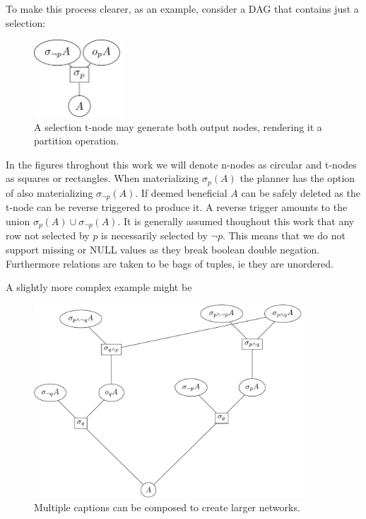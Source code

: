 To make this process clearer, as an example, consider a DAG that
contains just a selection:

\begin{figure}[H]
  \centering
  \includegraphics[width=0.3\textwidth]{./imgs/selnet.pdf}
  \caption{A selection t-node may generate both output nodes,
    rendering it a partition operation.}
\end{figure}

In the figures throghout this work we will denote n-nodes as
circular and t-nodes as squares or rectangles. When materializing
\(\sigma_p(A)\) the planner has the option of also materializing
\(\sigma_{\neg p}(A)\). If deemed beneficial \(A\) can be safely
deleted as the t-node can be reverse triggered to produce it. A
reverse trigger amounts to the union \(\sigma_{p}(A) \cup
\sigma_{\neg p}(A)\). It is generally assumed thoughout this work
that any row not selected by \(p\) is necessarily selected by \(\neg
p\). This means that we do not support missing or NULL values as
they break boolean double negation. Furthermore relations are taken
to be bags of tuples, ie they are unordered.

A slightly more complex example might be

\begin{figure}[H]
  \centering
  \includegraphics[width=0.9\textwidth]{./imgs/selsub.pdf}
  \caption{Multiple captions can be composed to create larger
    networks.}
\end{figure}

